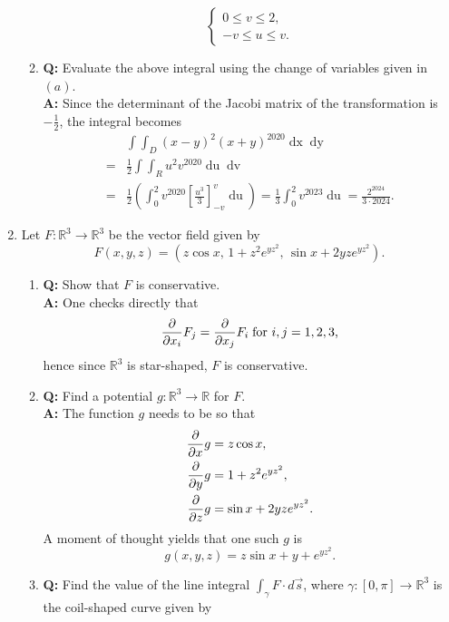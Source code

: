 \documentclass[a4paper,10pt]{article}
\def\R{\mathbb{R}}
\begin{document}
\begin{enumerate}
\begin{enumerate}
\[\begin{cases}
            0 \le v \le 2,\\
            -v \le u \le v \text{.}
        \end{cases}
        \]
        \item \textbf{Q:} Evaluate the above integral using the change of variables given in $(a)$.\\
        \textbf{A:} Since the determinant of the Jacobi matrix of the transformation is $- \frac{1}{2}$, the integral becomes
        \begin{align*}
            &\int \int_D (x - y)^2 (x + y)^{2020} \mathop{dx} \mathop{dy}\\
            = &\frac{1}{2} \int \int_R u^2v^{2020} \mathop{du} \mathop{dv}\\
            = &\frac{1}{2} \left(\int_0^2 v^{2020} \left[\frac{u^3}{3}\right]_{-v}^v \mathop{du}\right) = \frac{1}{3} \int_0^2 v^{2023} \mathop{du} = \frac{2^2024}{3 \cdot 2024} \text{.}
        \end{align*}
    \end{enumerate}
    \item Let $F: \R^3 \to \R^3$ be the vector field given by
    \[F(x, y, z) = (z \cos x,\, 1 + z^2e^{yz^2},\,\sin x + 2yze^{yz^2}) \text{.}\]
    \begin{enumerate}
        \item \textbf{Q:} Show that $F$ is conservative.\\
        \textbf{A:} One checks directly that
        \[\pdv{}{x_i} F_j = \pdv{}{x_j} F_i\; \text{for } i, j = 1, 2, 3 \text{,}\]
        hence since $\R^3$ is star-shaped, $F$ is conservative.
        \item \textbf{Q:} Find a potential $g: \R^3 \to \R$ for $F$.\\
        \textbf{A:} The function $g$ needs to be so that
        \begin{align*}
            \pdv{}{x} g &= z \cos x,\\
            \pdv{}{y} g &= 1 + z^2 e^{yz^2},\\
            \pdv{}{z} g &= \sin x + 2yze^{yz^2} \text{.}
        \end{align*}
        A moment of thought yields that one such $g$ is
        \[g(x, y, z) = z \sin x + y + e^{yz^2} \text{.}\]
        \item \textbf{Q:} Find the value of the line integral $\int_\gamma F \cdot d \Vec{s}$, where $\gamma: [0, \pi] \to \R^3$ is the coil-shaped curve given by
        \begin{multline*}

\end{multline*}
\end{enumerate}
\end{enumerate}
\end{document}
